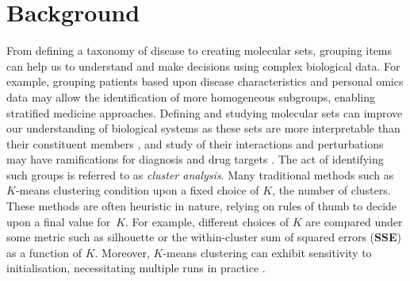 \documentclass{bmcart}
\begin{document}
\begin{frontmatter}
\begin{abstractbox}
			
			\begin{keyword}
			\end{keyword}
			
			
			
		\end{abstractbox}
		
	\end{frontmatter}
	
	\section*{Background}
	
	From defining a taxonomy of disease to creating molecular sets, grouping items can help us to understand and make decisions using complex biological data. For example, grouping patients based upon disease characteristics and personal omics data may allow the identification of more homogeneous subgroups, enabling stratified medicine approaches. Defining and studying molecular sets can improve our understanding of biological systems as these sets are more interpretable than their constituent members \citep{hejblum2015time}, and study of their interactions and perturbations may have ramifications for diagnosis and drug targets \citep{bai2013strategic, emmert2014gene}. 
	The act of identifying such groups is referred to as {\em cluster analysis}. Many traditional methods such as $K$-means clustering \citep{lloyd1982least, forgy1965cluster} condition upon a fixed choice of $K$, the number of clusters.  These methods are often heuristic in nature, relying on rules of thumb to decide upon a final value for~$K$. For example, different choices of $K$ are compared under some metric such as silhouette \citep{RousseeuwSilhouettesgraphicalaid1987} or the within-cluster sum of squared errors (\textbf{SSE}) as a function of $K$. Moreover, $K$-means clustering can exhibit sensitivity to initialisation, necessitating multiple runs in practice \citep{arthur2006k}.	
	
\end{document}
